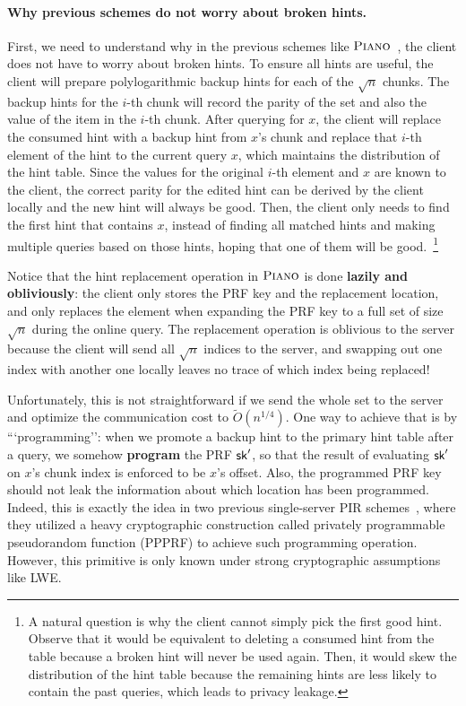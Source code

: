 \paragraph{Why previous schemes do not worry about broken hints.} First, we need
to understand why in the previous schemes like $\textsc{Piano}$~\cite{piano}, the client
does not have to worry about broken hints. To ensure all hints are useful, the
client will prepare polylogarithmic backup hints for each of the $\sqrt{n}$
chunks. The backup hints for the $i$-th chunk will record the parity of the set
and also the value of the item in the $i$-th chunk. After querying for $x$, the
client will replace the consumed hint with a backup hint from $x$'s chunk and
replace that $i$-th element of the hint to the current query $x$, which
maintains the distribution of the hint table. Since the values for the original
$i$-th element and $x$ are known to the client, the correct parity for the
edited hint can be derived by the client locally and the new hint will always be
good. Then, the client only needs to find the first hint that contains $x$,
instead of finding all matched hints and making multiple queries based on those
hints, hoping that one of them will be good.~\footnote{A natural question is why
the client cannot simply pick the first good hint. Observe that it would be
equivalent to deleting a consumed hint from the table because a broken hint will
never be used again. Then, it would skew the distribution of the hint table
because the remaining hints are  less likely to contain the past queries, which
leads to privacy leakage.}

Notice that the hint replacement operation in $\textsc{Piano}$ is done \textbf{lazily
and obliviously}: the client only stores the PRF key and the replacement
location, and only replaces the element when expanding the PRF key to a full set
of size $\sqrt{n}$ during the online query. The replacement operation is
oblivious to the server because the client will send all $\sqrt{n}$ indices to
the server, and swapping out one index with another one locally leaves no trace
of which index being replaced!

Unfortunately, this is not straightforward if we send the whole set to the
server and optimize the communication cost to $\widetilde{O}(n^{1/4})$.
One way to achieve that is by ```programming'': when we promote a backup hint to
the primary hint table after a query, we somehow \textbf{program} the PRF
$\mathsf{sk}'$, so that the result of evaluating $\mathsf{sk}'$ on $x$'s chunk index is enforced
to be $x$'s offset. Also, the programmed PRF key should not leak the information
about which location has been programmed. Indeed, this is exactly the idea in
two previous single-server PIR schemes~\cite{pir-ec23,lazza-pir}, where they
utilized a heavy cryptographic construction called privately programmable
pseudorandom function (PPPRF) to achieve such programming operation. However,
this primitive is only known under strong cryptographic assumptions like LWE. 

